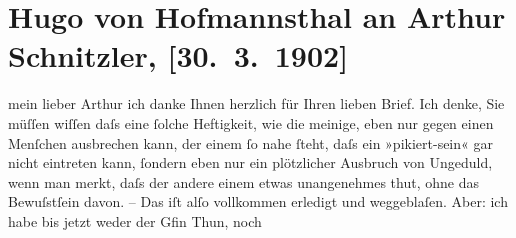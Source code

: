 

         
         \renewcommand{\erwaehntePersonen}{Personen: Eleonora Duse, Hugo von Hofmannsthal, Rudolf Kassner, Christiane von Thun-Hohenstein-Salm-Reifferscheidt}
         \renewcommand{\erwaehnteOrte}{Orte: Wien}
         \renewcommand{\erwaehnteWerke}{Werke: Über unsere Kraft. Zweiter Teil}
               \section[Hugo von Hofmannsthal an Arthur Schnitzler, {[}30. 3. 1902{]}]{ Hugo von Hofmannsthal an Arthur Schnitzler, {[}30. 3. 1902{]}}\nopagebreak{}\rehead{ }\begin{ledgroupsized}[t]{13cm}\normalsize\beginnumbering{} \toendnotes[C]{\smallbreak\pagebreak[2]} 
\toendnotes[C]{\smallbreak}\pstart{}{\pb}mein lieber Arthur\pend\pstart
           ich danke Ihnen herzlich für Ihren lieben Brief. Ich denke, Sie müſſen wiſſen daſs
               eine ſolche Heftigkeit, wie die meinige, eben nur gegen einen Menſchen ausbrechen
               kann, der einem ſo nahe ſteht, daſs ein »pikiert-sein« gar nicht {\pb}eintreten kann, ſondern eben nur
               ein plötzlicher Ausbruch von Ungeduld, wenn man merkt, daſs der andere einem etwas
               unangenehmes thut, ohne das Bewuſstſein davon.\pend
           \pstart
           \numberlinefalse{}\centering{}–\numberlinetrue{}\pend
           \pstart
           \noindent{}Das iſt alſo vollkommen erledigt und weggeblaſen. {\pb}Aber:\pend
           \pstart
           ich habe bis jetzt weder der Gfin Thun, noch

\end{ledgroupsized}
